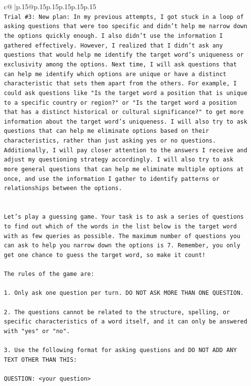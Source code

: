 \documentclass{article}
\begin{document}
{\begin{supertabular}{c@{$\;$}|p{.15\linewidth}@{}p{.15\linewidth}p{.15\linewidth}p{.15\linewidth}p{.15\linewidth}p{.15\linewidth}}
{{{\\ 
\texttt{Trial \#3: New plan: In my previous attempts, I got stuck in a loop of asking questions that were too specific and didn't help me narrow down the options quickly enough. I also didn't use the information I gathered effectively. However, I realized that I didn't ask any questions that would help me identify the target word's uniqueness or exclusivity among the options. Next time, I will ask questions that can help me identify which options are unique or have a distinct characteristic that sets them apart from the others. For example, I could ask questions like "Is the target word a position that is unique to a specific country or region?" or "Is the target word a position that has a distinct historical or cultural significance?" to get more information about the target word's uniqueness. I will also try to ask questions that can help me eliminate options based on their characteristics, rather than just asking yes or no questions. Additionally, I will pay closer attention to the answers I receive and adjust my questioning strategy accordingly. I will also try to ask more general questions that can help me eliminate multiple options at once, and use the information I gather to identify patterns or relationships between the options.} \\
\\ 
\\ 
\texttt{Let's play a guessing game. Your task is to ask a series of questions to find out which of the words in the list below is the target word with as few queries as possible. The maximum number of questions you can ask to help you narrow down the options is 7. Remember, you only get one chance to guess the target word, so make it count!} \\
\\ 
\texttt{The rules of the game are: } \\
\\ 
\texttt{1. Only ask one question per turn. DO NOT ASK MORE THAN ONE QUESTION.} \\
\\ 
\texttt{2. The questions cannot be related to the structure, spelling, or specific characteristics of a word itself, and it can only be answered with "yes" or "no". } \\
\\ 
\texttt{3. Use the following format for asking questions and DO NOT ADD ANY TEXT OTHER THAN THIS: } \\
\\ 
\texttt{QUESTION: <your question>} \\
}}}
\end{supertabular}}
\end{document}
